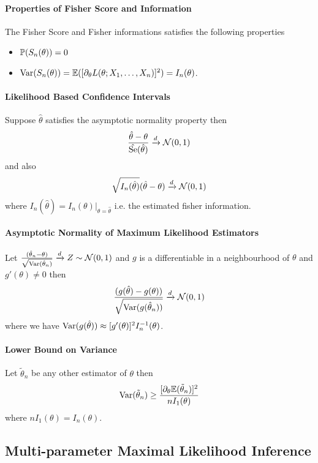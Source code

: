\paragraph{Properties of Fisher Score and Information}
The Fisher Score and Fisher informations satisfies the following properties
\begin{itemize}
    \item \(\mathbb{P}(S_n(\theta)) = 0\) 
    \item \(\mathrm{Var}(S_n(\theta)) = \mathbb{E}([\partial_\theta L(\theta; X_1, \dots, X_n)]^2) = I_n(\theta)\).
\end{itemize}

\paragraph{Likelihood Based Confidence Intervals}
Suppose \(\hat{\theta}\) satisfies the asymptotic normality property then
\[\frac{\hat{\theta} - \theta}{\hat{\mathrm{Se}}(\hat{\theta})} \xrightarrow{d} \mathcal{N}(0,1)\]
and also
\[\sqrt{I_n(\hat{\theta})}(\hat{\theta} - \theta) \xrightarrow{d} \mathcal{N}(0,1)\]
where \(I_n(\hat{\theta}) = I_n(\theta)|_{\theta = \hat{\theta}}\) i.e. the estimated fisher information.

\paragraph{Asymptotic Normality of Maximum Likelihood Estimators}
Let \(\frac{(\hat{\theta}_n - \theta)}{\sqrt{\mathrm{Var}(\hat{\theta}_n)}} \xrightarrow{d} Z \sim \mathcal{N}(0,1)\) and \(g\) is a differentiable in a neighbourhood of \(\theta\) and \(g'(\theta) \neq 0\) then
\[\frac{(g(\hat{\theta}) - g(\theta))}{\sqrt{\mathrm{Var}(g(\hat{\theta}_n))}} \xrightarrow{d} \mathcal{N}(0,1)\]
where we have \(\mathrm{Var}(g(\hat{\theta})) \approx [g'(\theta)]^2I_n^{-1}(\theta)\).

\paragraph{Lower Bound on Variance}
Let \(\tilde{\theta}_n\) be any other estimator of \(\theta\) then
\[\mathrm{Var}(\tilde{\theta}_n) \geq \frac{[\partial_\theta \mathbb{E}(\tilde{\theta}_n)]^2}{nI_1(\theta)}\]
where \(nI_1(\theta) = I_n(\theta)\).

\subsection{Multi-parameter Maximal Likelihood Inference}

